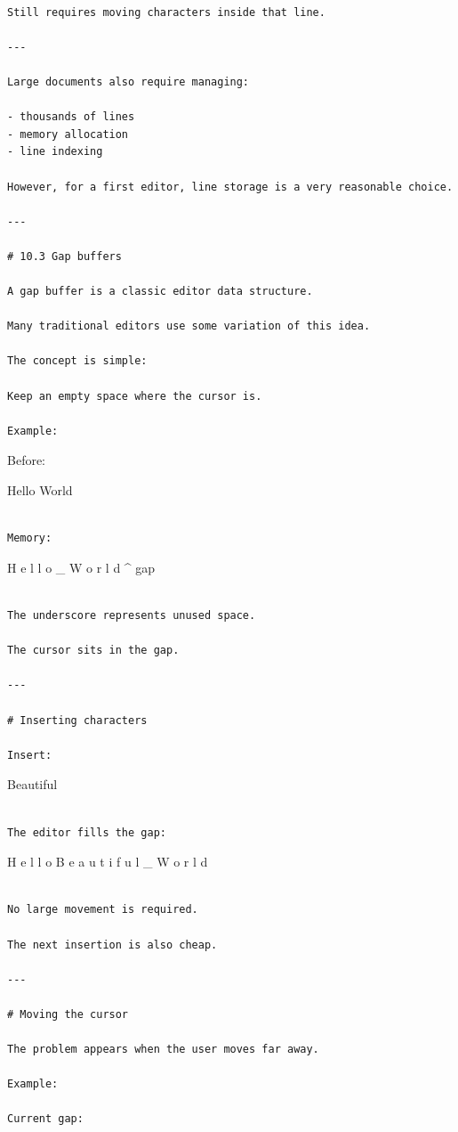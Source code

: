 \documentclass[
  oneside,
  openany]{book}
\begin{document}
\begin{verbatim}

Still requires moving characters inside that line.

---

Large documents also require managing:

- thousands of lines
- memory allocation
- line indexing

However, for a first editor, line storage is a very reasonable choice.

---

# 10.3 Gap buffers

A gap buffer is a classic editor data structure.

Many traditional editors use some variation of this idea.

The concept is simple:

Keep an empty space where the cursor is.

Example:
\end{verbatim}

Before:

Hello World

\begin{verbatim}

Memory:
\end{verbatim}

H e l l o \_ W o r l d \^{} gap

\begin{verbatim}

The underscore represents unused space.

The cursor sits in the gap.

---

# Inserting characters

Insert:
\end{verbatim}

Beautiful

\begin{verbatim}

The editor fills the gap:
\end{verbatim}

H e l l o B e a u t i f u l \_ W o r l d

\begin{verbatim}

No large movement is required.

The next insertion is also cheap.

---

# Moving the cursor

The problem appears when the user moves far away.

Example:

Current gap:
\end{verbatim}
\end{document}

